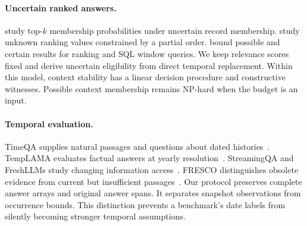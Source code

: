 \paragraph{Uncertain ranked answers.}
\citet{hua2008ranking} study top-$k$ membership probabilities under uncertain record membership.
\citet{amarilli2017topk} study unknown ranking values constrained by a partial order.
\citet{feng2023ranking} bound possible and certain results for ranking and SQL window queries.
We keep relevance scores fixed and derive uncertain eligibility from direct temporal replacement.
Within this model, context stability has a linear decision procedure and constructive witnesses.
Possible context membership remains NP-hard when the budget is an input.

\paragraph{Temporal evaluation.}
TimeQA supplies natural passages and questions about dated histories~\citep{chen2021timeqa}.
TempLAMA evaluates factual answers at yearly resolution~\citep{dhingra2022templama}.
StreamingQA and FreshLLMs study changing information access~\citep{liska2022streamingqa,vu2024freshllms}.
FRESCO distinguishes obsolete evidence from current but insufficient passages~\citep{an2026fresco}.
Our protocol preserves complete answer arrays and original answer spans.
It separates snapshot observations from occurrence bounds.
This distinction prevents a benchmark's date labels from silently becoming stronger temporal assumptions.
